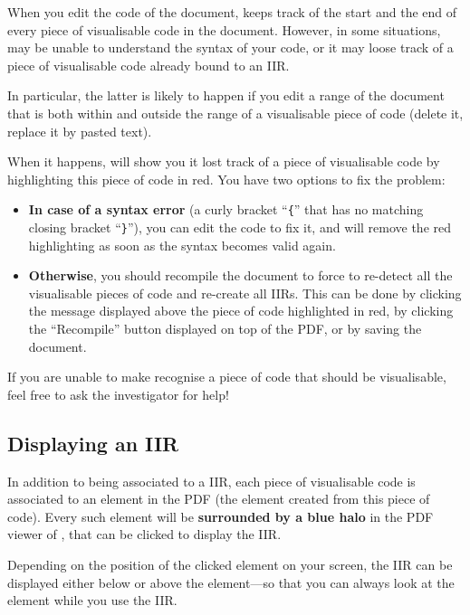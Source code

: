 \documentclass[11pt, a4paper]{article}
\begin{document}
\begin{warning}
    When you edit the code of the document, \iLaTeX{} keeps track of the start and the end of every piece of visualisable code in the document.
    However, in some situations, \iLaTeX{} may be unable to understand the syntax of your code, or it may loose track of a piece of visualisable code already bound to an IIR.
    
    In particular, the latter is likely to happen if you edit a range of the document that is both within and outside the range of a visualisable piece of code (\eg delete it, replace it by pasted text).
    
    When it happens, \iLaTeX{} will show you it lost track of a piece of visualisable code by highlighting this piece of code in red.
    You have two options to fix the problem:
    
    \begin{itemize}
        \item \textbf{In case of a syntax error} (\eg a curly bracket ``\verb|{|'' that has no matching closing bracket ``\verb|}|''), you can edit the code to fix it, and \iLaTeX{} will remove the red highlighting as soon as the syntax becomes valid again.
        
        \item \textbf{Otherwise}, you should recompile the document to force \iLaTeX{} to re-detect all the visualisable pieces of code and re-create all IIRs.
        This can be done by clicking the message displayed above the piece of code highlighted in red, by clicking the ``Recompile'' button displayed on top of the PDF, or by saving the document.
    \end{itemize}
\end{warning}

If you are unable to make \iLaTeX{} recognise a piece of code that should be visualisable, feel free to ask the investigator for help!


\subsection{Displaying an IIR}

In addition to being associated to a IIR, each piece of visualisable code is associated to an element in the PDF (the element created from this piece of code).
Every such element will be \textbf{surrounded by a blue halo} in the PDF viewer of \iLaTeX{}, that can be clicked to display the IIR.

Depending on the position of the clicked element on your screen, the IIR can be displayed either below or above the element---so that you can always look at the element while you use the IIR.
\end{document}
